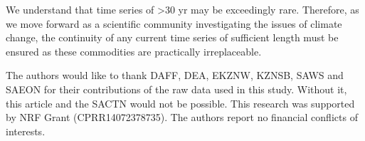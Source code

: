 \documentclass[twocol]{ametsoc}
\begin{document}
We understand that time series of \textgreater 30 yr may be exceedingly rare. Therefore, as we move forward as a scientific community investigating the issues of climate change, the continuity of any current time series of sufficient length must be ensured as these commodities are practically irreplaceable.
%

\acknowledgments
The authors would like to thank DAFF, DEA, EKZNW, KZNSB, SAWS and SAEON for their contributions of the raw data used in this study. Without it, this article and the SACTN would not be possible. This research was supported by NRF Grant (CPRR14072378735). The authors report no financial conflicts of interests.

%

% 
% 
\end{document}
